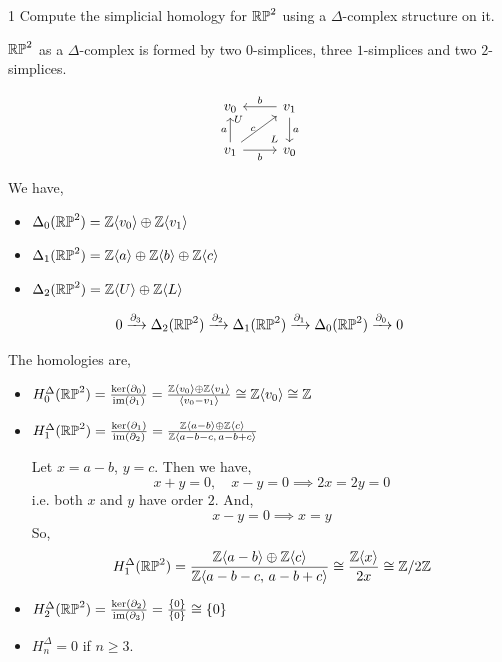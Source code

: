 \documentclass[12pt]{article}
\begin{document}


\begin{problem} {1}
    Compute the simplicial homology for $\mathbb{RP}^2$ using a $\Delta$-complex structure on it. 
\end{problem}

\begin{solution}
    \bbni

    $\mathbb{RP}^2$ as a $\Delta$-complex is formed by two $0$-simplices, three $1$-simplices and two $2$-simplices. 

     \[
    \begin{tikzcd}
    v_0   & v_1  \arrow[d,"a"] \arrow[l,"b", swap]\\
    v_1 \arrow[u,"a"] \arrow[r,swap,"b"] \arrow[ur,"c"{yshift = -.05in}] \arrow[ur, phantom, "\scriptstyle U"{yshift=0.1in, xshift=-.2in}] & v_0  \arrow[ul, phantom, "\scriptstyle L", very near start]
    \end{tikzcd}
    \]
    

    We have, 
    \begin{itemize}
        \item $\Delta_0(\mathbb{RP}^2) = \mathbb Z \langle v_0 \rangle \oplus \mathbb Z \langle v_1 \rangle$ 
        \item $\Delta_1(\mathbb{RP}^2) = \mathbb Z \langle a \rangle \oplus \mathbb Z \langle b \rangle \oplus \mathbb Z \langle c \rangle $ 
        \item $\Delta_2(\mathbb{RP}^2) = \mathbb Z \langle U \rangle \oplus \mathbb Z \langle L \rangle$ 

    \end{itemize}

    \[0 \xrightarrow{\partial_3} \Delta_2(\mathbb{RP}^2) \xrightarrow{\partial_2} \Delta_1(\mathbb{RP}^2) \xrightarrow{\partial_1} \Delta_0 (\mathbb{RP}^2) \xrightarrow{\partial_0} 0\]

    The homologies are, 
     \begin{itemize}
        \item $H_0^\Delta(\mathbb{RP}^2) = \frac{\ker(\partial_0)}{\operatorname{im}(\partial_1)} =  \frac{\mathbb Z\langle v_0 \rangle \oplus \mathbb Z\langle v_1 \rangle}{\langle v_0 - v_1\rangle} \cong \mathbb Z\langle v_0 \rangle \cong \mathbb Z$
        
        \item $H_1^\Delta(\mathbb{RP}^2) = \frac{\ker(\partial_1)}{\operatorname{im}(\partial_2)} =  \frac{\mathbb Z\langle a -b  \rangle \oplus \mathbb Z \langle c \rangle}{ \mathbb Z\langle a - b - c, \, a - b + c \rangle}$
        
        Let $x = a - b$, $y = c$. Then we have, 
        \[x + y = 0, \quad x - y = 0 \implies 2x = 2 y = 0\] 
        i.e. both $x$ and $y$ have order $2$. And, 
        \[x - y = 0 \implies x = y\]
        So,  
        \[H_1^\Delta(\mathbb{RP}^2) = \frac{\mathbb Z\langle a -b  \rangle \oplus \mathbb Z \langle c \rangle}{ \mathbb Z\langle a - b - c, \, a - b + c \rangle} \cong \frac{\mathbb Z\langle x \rangle }{2x} \cong \mathbb Z/2\mathbb Z\]

        
        \item $H^\Delta_2(\mathbb{RP}^2) = \frac{\ker(\partial_2)}{\operatorname{im}(\partial_3)} = \frac{\{0\}}{\{0\}} \cong \{0\} $

        \item $H_n^\Delta = 0$ if $n \geq 3$. 
    \end{itemize}
\end{solution}
\end{document}
